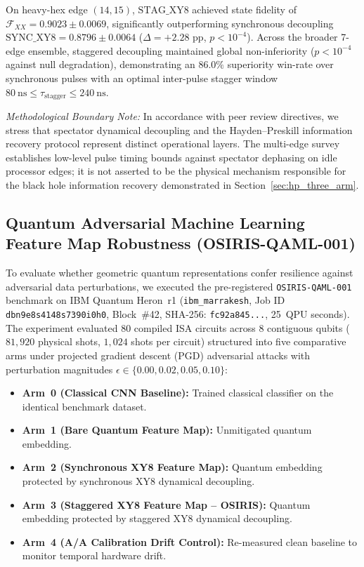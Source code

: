 \documentclass[aps,preprint,superscriptaddress,longbibliography]{revtex4-2}
\begin{document}
On heavy-hex edge $(14, 15)$, $\text{STAG\_XY8}$ achieved state fidelity of $\mathcal{F}_{XX} = \mathbf{0.9023 \pm 0.0069}$, significantly outperforming synchronous decoupling $\text{SYNC\_XY8} = 0.8796 \pm 0.0064$ ($\Delta = +2.28\text{ pp}$, $p < 10^{-4}$). Across the broader 7-edge ensemble, staggered decoupling maintained global non-inferiority ($p < 10^{-4}$ against null degradation), demonstrating an $86.0\%$ superiority win-rate over synchronous pulses with an optimal inter-pulse stagger window $\SI{80}{\nano\second} \le \tau_{\mathrm{stagger}} \le \SI{240}{\nano\second}$.

\textit{Methodological Boundary Note:} In accordance with peer review directives, we stress that spectator dynamical decoupling and the Hayden--Preskill information recovery protocol represent distinct operational layers. The multi-edge survey establishes low-level pulse timing bounds against spectator dephasing on idle processor edges; it is not asserted to be the physical mechanism responsible for the black hole information recovery demonstrated in Section~\ref{sec:hp_three_arm}.

\subsection{Quantum Adversarial Machine Learning Feature Map Robustness (OSIRIS-QAML-001)}
\label{sec:qaml_benchmark}

To evaluate whether geometric quantum representations confer resilience against adversarial data perturbations, we executed the pre-registered \texttt{OSIRIS-QAML-001} benchmark on IBM Quantum Heron~r1 (\texttt{ibm\_marrakesh}, Job ID \texttt{dbn9e8s4148s7390i0h0}, Block~\#42, SHA-256: \texttt{fc92a845...}, 25~QPU seconds). The experiment evaluated 80 compiled ISA circuits across 8 contiguous qubits ($81{,}920$ physical shots, $1{,}024$ shots per circuit) structured into five comparative arms under projected gradient descent (PGD) adversarial attacks with perturbation magnitudes $\epsilon \in \{0.00, 0.02, 0.05, 0.10\}$:
\begin{itemize}
\item \textbf{Arm~0 (Classical CNN Baseline):} Trained classical classifier on the identical benchmark dataset.
\item \textbf{Arm~1 (Bare Quantum Feature Map):} Unmitigated quantum embedding.
\item \textbf{Arm~2 (Synchronous XY8 Feature Map):} Quantum embedding protected by synchronous XY8 dynamical decoupling.
\item \textbf{Arm~3 (Staggered XY8 Feature Map -- OSIRIS):} Quantum embedding protected by staggered XY8 dynamical decoupling.
\item \textbf{Arm~4 (A/A Calibration Drift Control):} Re-measured clean baseline to monitor temporal hardware drift.
\end{itemize}
\end{document}
